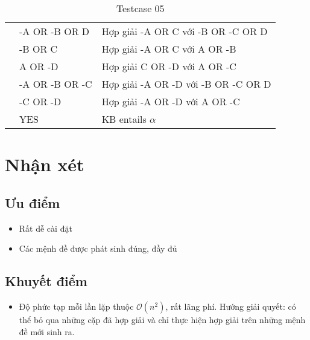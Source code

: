 \documentclass[12pt]{article}
\begin{document}
\begin{table}[H]
\begin{tabular}{|l|l|l|}
         & -A OR -B OR D & Hợp giải -A OR C với -B OR -C OR D \\
         & -B OR C & Hợp giải -A OR C với A OR -B \\
         & A OR -D & Hợp giải C OR -D với A OR -C \\
         & -A OR -B OR -C & Hợp giải -A OR -D với -B OR -C OR D \\
         & -C OR -D & Hợp giải -A OR -D với A OR -C \\
         & YES & KB entails $\alpha$ \\
        \hline
    \end{tabular}
    \caption{Testcase 05}
\end{table}

\section{Nhận xét}
\subsection{Ưu điểm}
\begin{itemize}
\item Rất dễ cài đặt
\item Các mệnh đề được phát sinh đúng, đầy đủ
\end{itemize}
\subsection{Khuyết điểm}
\begin{itemize}
    \item Độ phức tạp mỗi lần lặp thuộc $\mathcal{O}(n^2)$, rất lãng phí. Hướng giải quyết: có thể bỏ qua những cặp đã hợp giải và chỉ thực hiện hợp giải trên những mệnh đề mới sinh ra.
\end{itemize}

\printbibliography
\end{document}
